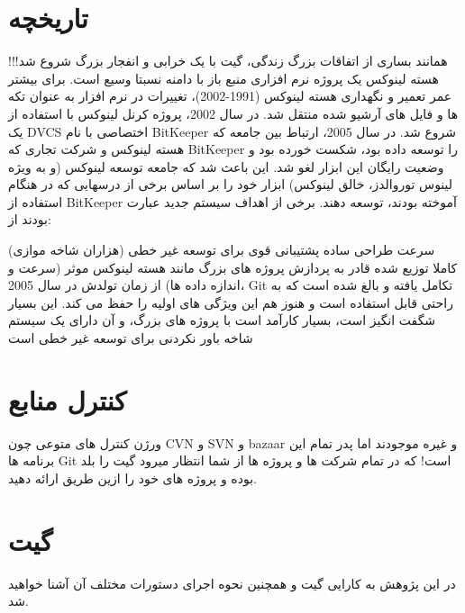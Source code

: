 \newpage

\section{تاریخچه}
همانند بساری از اتفاقات بزرگ زندگی، گیت با یک خرابی و انفجار بزرگ شروع شد!!!
\newline
هسته لینوکس یک پروژه نرم افزاری منبع باز با دامنه نسبتا وسیع است. برای بیشتر عمر تعمیر و نگهداری هسته لینوکس (1991-2002)، تغییرات در نرم افزار به عنوان تکه ها و فایل های آرشیو شده منتقل شد. در سال 2002، پروژه کرنل لینوکس با استفاده از یک DVCS اختصاصی با نام BitKeeper شروع شد.
\newline
در سال 2005، ارتباط بین جامعه که هسته لینوکس و شرکت تجاری که BitKeeper را توسعه داده بود، شکست خورده بود و وضعیت رایگان این ابزار لغو شد. این باعث شد که جامعه توسعه لینوکس (و به ویژه لینوس توروالدز، خالق لینوکس) ابزار خود را بر اساس برخی از درسهایی که در هنگام استفاده از BitKeeper آموخته بودند، توسعه دهند. برخی از اهداف سیستم جدید عبارت بودند از:

سرعت
\newline
طراحی ساده
\newline
پشتیبانی قوی برای توسعه غیر خطی (هزاران شاخه موازی)
\newline
کاملا توزیع شده
\newline
قادر به پردازش پروژه های بزرگ مانند هسته لینوکس موثر (سرعت و اندازه داده ها)
\newline
از زمان تولدش در سال 2005، Git تکامل یافته و بالغ شده است که به راحتی قابل استفاده است و هنوز هم این ویژگی های اولیه را حفظ می کند. این بسیار شگفت انگیز است، بسیار کارآمد است با پروژه های بزرگ، و آن دارای یک سیستم شاخه باور نکردنی برای توسعه غیر خطی است
\newline
\section{کنترل منابع }

ورژن کنترل های متوعی چون CVN و SVN و bazaar و غیره موجودند اما پدر تمام این برنامه ها Git است! که در تمام شرکت ها و پروژه ها از شما انتظار میرود گیت را بلد بوده و پروژه های خود را ازین طریق ارائه دهید.
\section{گیت }
در این پژوهش به کارایی گیت و همچنین نحوه اجرای دستورات مختلف آن آشنا خواهید شد.
